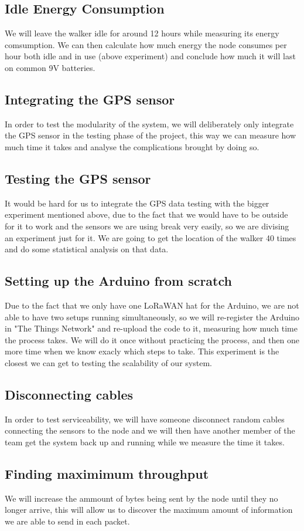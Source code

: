 	\subsection{Idle Energy Consumption}
		We will leave the walker idle for around 12 hours while measuring its energy comsumption.
		We can then calculate how much energy the node consumes per hour both idle and in use (above experiment) and conclude how much it will last on common 9V batteries.

	\subsection{Integrating the GPS sensor}
		In order to test the modularity of the system, we will deliberately only integrate the GPS sensor in the testing phase of the project, this way we can measure how much time it takes and analyse the complications brought by doing so.

	\subsection{Testing the GPS sensor}
		It would be hard for us to integrate the GPS data testing with the bigger experiment mentioned above, due to the fact that we would have to be outside for it to work and the sensors we are using break very easily, so we are divising an experiment just for it.
		We are going to get the location of the walker 40 times and do some statistical analysis on that data.

	\subsection{Setting up the Arduino from scratch}
		Due to the fact that we only have one LoRaWAN hat for the Arduino, we are not able to have two setups running simultaneously, so we will re-register the Arduino in "The Things Network" and re-upload the code to it, measuring how much time the process takes. We will do it once without practicing the process, and then one more time when we know exacly which steps to take. This experiment is the closest we can get to testing the scalability of our system.

	\subsection{Disconnecting cables}
		In order to test serviceability, we will have someone disconnect random cables connecting the sensors to the node and we will then have another member of the team get the system back up and running while we measure the time it takes.

	\subsection{Finding maximimum throughput}
		We will increase the ammount of bytes being sent by the node until they no longer arrive, this will allow us to discover the maximum amount of information we are able to send in each packet.

